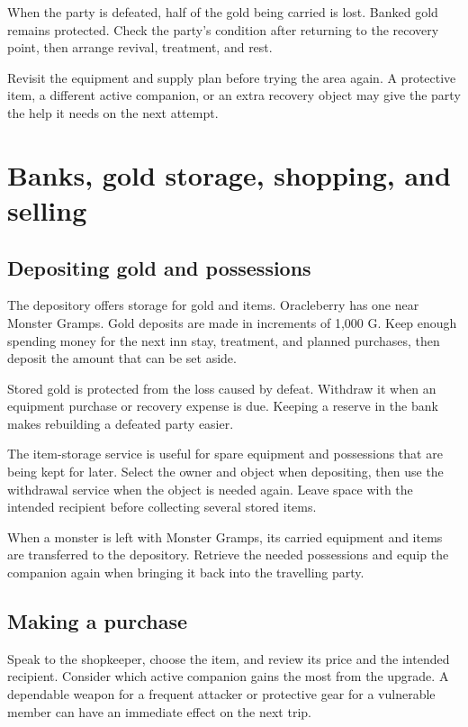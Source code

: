 When the party is defeated, half of the gold being carried is lost.
Banked gold remains protected. Check the party's condition after returning
to the recovery point, then arrange revival, treatment, and rest.

Revisit the equipment and supply plan before trying the area again.
A protective item, a different active companion, or an extra recovery
object may give the party the help it needs on the next attempt.

\section{Banks, gold storage, shopping, and selling}

\subsection*{Depositing gold and possessions}

The depository offers storage for gold and items. Oracleberry has one
near Monster Gramps. Gold deposits are made in increments of 1,000 G.
Keep enough spending money for the next inn stay, treatment, and planned
purchases, then deposit the amount that can be set aside.

Stored gold is protected from the loss caused by defeat. Withdraw it when
an equipment purchase or recovery expense is due. Keeping a reserve in
the bank makes rebuilding a defeated party easier.

The item-storage service is useful for spare equipment and possessions
that are being kept for later. Select the owner and object when depositing,
then use the withdrawal service when the object is needed again. Leave
space with the intended recipient before collecting several stored items.

When a monster is left with Monster Gramps, its carried equipment and
items are transferred to the depository. Retrieve the needed possessions
and equip the companion again when bringing it back into the travelling
party.

\subsection*{Making a purchase}

Speak to the shopkeeper, choose the item, and review its price and the
intended recipient. Consider which active companion gains the most from
the upgrade. A dependable weapon for a frequent attacker or protective
gear for a vulnerable member can have an immediate effect on the next trip.

